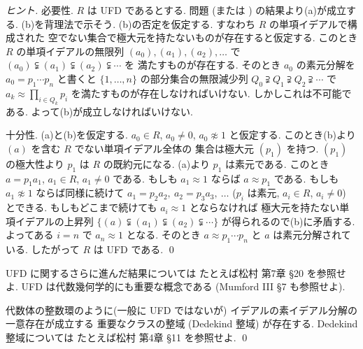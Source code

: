 \documentclass[12pt,twoside]{jarticle}
\begin{document}
\begin{proof}[ヒント]
 必要性. 
 $R$ は UFD であるとする.
 問題  (または ) 
 の結果より(a)が成立する. (b)を背理法で示そう.
 (b)の否定を仮定する. すなわち $R$ の単項イデアルで構成された
 空でない集合で極大元を持たないものが存在すると仮定する. 
 このとき $R$ の単項イデアルの無限列 $(a_0),(a_1),(a_2),\ldots$ で %
 $(a_0)\subsetneqq(a_1)\subsetneqq(a_2)\subsetneqq\cdots$ を
 満たすものが存在する.
 そのとき $a_0$ の素元分解を $a_0=p_1\cdots p_n$ と書くと %
 $\{1,\ldots,n\}$ の部分集合の無限減少列 %
 $Q_0\supsetneqq Q_1 \supsetneqq Q_2\supsetneqq\cdots$ で
 $a_k\approx \prod_{i\in Q_k}p_i$ を満たすものが存在しなければいけない.
 しかしこれは不可能である. よって(b)が成立しなければいけない.

 十分性.
 (a)と(b)を仮定する.
 $a_0\in R$, $a_0\ne 0$, $a_0\not\approx 1$ と仮定する.
 このとき(b)より $(a)$ を含む $R$ でない単項イデアル全体の
 集合は極大元 $(p_1)$ を持つ.
 $(p_1)$ の極大性より $p_1$ は $R$ の既約元になる. 
 (a)より $p_1$ は素元である.
 このとき $a=p_1a_1$, $a_1\in R$, $a_1\ne 0$ である.
 もしも $a_1\approx 1$ ならば $a\approx p_1$ である.
 もしも $a_1\not\approx 1$ ならば同様に続けて
 $a_1=p_2a_2,\ a_2=p_3a_3,\ \ldots$ 
 ($p_i$ は素元, $a_i\in R$, $a_i\ne 0$) とできる. 
 もしもどこまで続けても $a_i\approx 1$ とならなければ %
 極大元を持たない単項イデアルの上昇列 %
 $\{(a)\subsetneqq(a_1)\subsetneqq(a_2)\subsetneqq\cdots\}$ 
 が得られるので(b)に矛盾する.
 よってある $i=n$ で $a_n\approx 1$ となる. 
 そのとき $a\approx p_1\cdots p_n$ と $a$ は素元分解されている.
 したがって $R$ は UFD である.
 \qed
\end{proof}

\begin{guide}
 UFD に関するさらに進んだ結果については
 たとえば松村 \cite{matsumura-1980-2000} 第7章 \S20 を参照せよ.
 UFD は代数幾何学的にも重要な概念である
 (Mumford \cite{Red-Book} III \S7 も参照せよ).

 代数体の整数環のように(一般に UFD ではないが)
 イデアルの素イデアル分解の一意存在が成立する
 重要なクラスの整域 (Dedekind 整域) が存在する. 
 Dedekind 整域については
 たとえば松村 \cite{matsumura-1980-2000} 第4章 \S11 を参照せよ.
 \qed
\end{guide}
\end{document}
